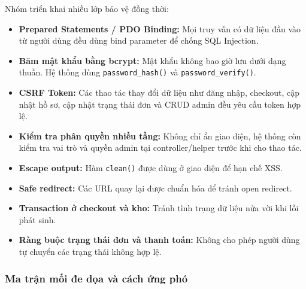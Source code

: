 \documentclass[11pt, a4paper]{article}
\begin{document}
Nhóm triển khai nhiều lớp bảo vệ đồng thời:

\begin{itemize}[leftmargin=*]
    \item \textbf{Prepared Statements / PDO Binding:} Mọi truy vấn có dữ liệu đầu vào
          từ người dùng đều dùng bind parameter để chống SQL Injection.
    \item \textbf{Băm mật khẩu bằng bcrypt:} Mật khẩu không bao giờ lưu dưới dạng thuần.
          Hệ thống dùng \texttt{password\_hash()} và \texttt{password\_verify()}.
    \item \textbf{CSRF Token:} Các thao tác thay đổi dữ liệu như đăng nhập, checkout,
          cập nhật hồ sơ, cập nhật trạng thái đơn và CRUD admin đều yêu cầu token hợp lệ.
    \item \textbf{Kiểm tra phân quyền nhiều tầng:} Không chỉ ẩn giao diện, hệ thống còn
          kiểm tra vai trò và quyền admin tại controller/helper trước khi cho thao tác.
    \item \textbf{Escape output:} Hàm \texttt{clean()} được dùng ở giao diện để hạn chế XSS.
    \item \textbf{Safe redirect:} Các URL quay lại được chuẩn hóa để tránh open redirect.
    \item \textbf{Transaction ở checkout và kho:} Tránh tình trạng dữ liệu nửa vời khi lỗi phát sinh.
    \item \textbf{Ràng buộc trạng thái đơn và thanh toán:} Không cho phép người dùng tự
          chuyển các trạng thái không hợp lệ.
\end{itemize}

\subsubsection{Ma trận mối đe dọa và cách ứng phó}
\end{document}
